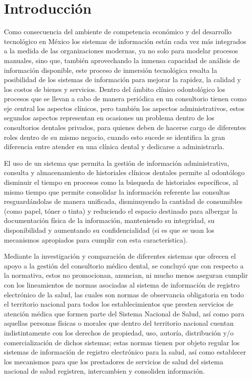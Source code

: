 \pagebreak
\setcounter{page}{1}
\pagestyle{fancy}
\section{Introducción}

Como consecuencia del ambiente de competencia económico y del desarrollo tecnológico en México los sistemas de información están cada vez más integrados a la medida de las organizaciones modernas, ya no solo para modelar procesos manuales, sino que, también aprovechando la inmensa capacidad de análisis de información disponible, este proceso de inmersión tecnológica resalta la posibilidad de los sistemas de información para mejorar la rapidez, la calidad y los costos de bienes y servicios. Dentro del ámbito clínico odontológico los procesos que se llevan a cabo de manera periódica en un consultorio tienen como eje central los aspectos clínicos, pero también los aspectos administrativos, estos segundos aspectos representan en ocasiones un problema dentro de los consultorios dentales privados, para quienes deben de hacerse cargo de diferentes roles dentro de su mismo negocio, cuando esto sucede se identifica la gran diferencia entre atender en una clínica dental y dedicarse a administrarla.

\vspace{1em}

El uso de un sistema que permita la gestión de información administrativa, consulta y almacenamiento de historiales clínicos dentales permite al odontólogo disminuir el tiempo en procesos como la búsqueda de historiales específicos, al mismo tiempo que permite consolidar la información referente las consultas resguardándolas de manera unificada, disminuyendo la cantidad de consumibles (como papel, tóner o tinta) y reduciendo el espacio destinado para albergar la documentación física de la información, manteniendo su integridad, su disponibilidad y aumentando su confidencialidad (si es que se usan los mecanismos apropiados para cumplir con esta característica).

\vspace{1em}

Mediante la investigación y comparación de diferentes sistemas que ofrecen el apoyo a la gestión del consultorio médico dental, se concluyó que con respecto a la normativa, estos no promocionan, anuncian, ni mucho menos aseguran cumplir con los lineamientos de normas asociadas al sistema de información de registro electrónico de la salud, las cuales son normas de observancia obligatoria en todo el territorio nacional para todos los establecimientos que presten servicios de atención médica que formen parte del Sistema Nacional de Salud, así como para aquellas personas físicas o morales que dentro del territorio nacional cuentan indistintamente con los derechos de propiedad, uso, autoría, distribución y/o comercialización de dichos sistemas; estas normas tienen por objeto regular los sistemas de información de registro electrónico para la salud, así como establecer los mecanismos para que los prestadores de servicios de salud del sistema nacional de salud registren, intercambien y consoliden información.

